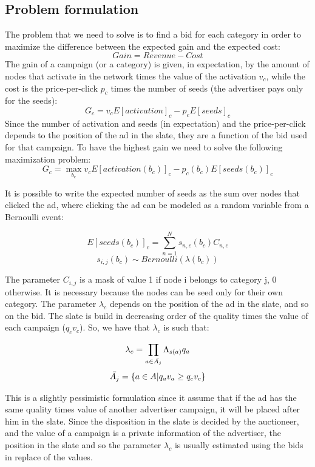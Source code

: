 \documentclass{article}
\begin{document}
\subsection{Problem formulation}
The problem that we need to solve is to find a bid for each category in order to maximize the difference between the expected gain and the expected cost: 
$$Gain = Revenue - Cost$$
The gain of a campaign (or a category) is given, in expectation, by the amount of nodes that activate in the network times the value of the activation $v_c$, while the cost is the price-per-click $p_c$ times the number of seeds (the advertiser pays only for the seeds): 
$$G_c = v_c E[activation]_c - p_cE[seeds]_c$$
Since the number of activation and seeds (in expectation) and the price-per-click depends to the position of the ad in the slate, they are a function of the bid used for that campaign. To have the highest gain we need to solve the following maximization problem:
$$G_c = \max_{b_c} v_cE[activation(b_c)]_c - p_c(b_c)E[seeds(b_c)]_c$$

It is possible to write the expected number of seeds as the sum over nodes that clicked the ad, where clicking the ad can be modeled as a random variable from a Bernoulli event:

\[E[seeds(b_c)]_c = \sum_{n=1}^{N}s_{n,c}(b_c)C_{n,c}\]
\[ s_{i,j}(b_c) \sim Bernoulli(\lambda(b_c)) \]

The parameter $C_{i,j}$ is a mask of value 1 if node i belongs to category j, 0 otherwise. It is necessary because the nodes can be seed only for their own category.
The parameter $\lambda_c$ depends on the position of the ad in the slate, and so on the bid. The slate is build in decreasing order of the quality times the value of each campaign ($q_cv_c$). So, we have that $\lambda_c$ is such that:

\[\lambda_c = \prod_{a \in \Bar{A_j}}\Lambda_{s(a)}q_a\]
\[\Bar{A_j} = \{a \in A \vert q_av_a \geq q_cv_c \}\]

This is a slightly pessimistic formulation since it assume that if the ad has the same quality times value of another advertiser campaign, it will be placed after him in the slate. Since the disposition in the slate is decided by the auctioneer, and the value of a campaign is a private information of the advertiser, the position in the slate and so the parameter $\lambda_c$ is usually estimated using the bids in replace of the values.
\newline
\end{document}
